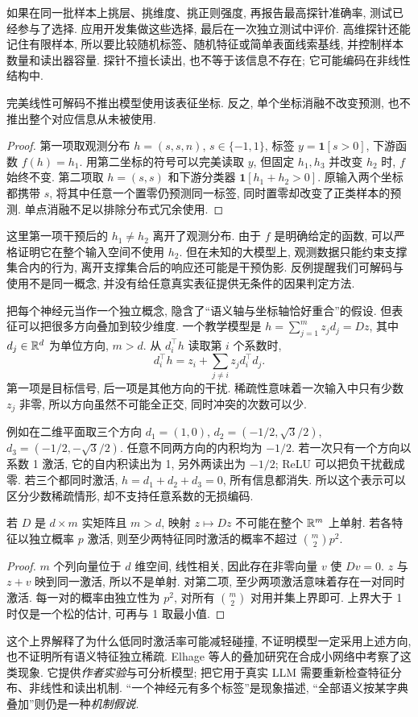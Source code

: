 如果在同一批样本上挑层、挑维度、挑正则强度, 再报告最高探针准确率, 测试已经参与了选择. 应用开发集做这些选择, 最后在一次独立测试中评价. 高维探针还能记住有限样本, 所以要比较随机标签、随机特征或简单表面线索基线, 并控制样本数量和读出器容量. 探针不擅长读出, 也不等于该信息不存在; 它可能编码在非线性结构中.

\begin{proposition}
完美线性可解码不推出模型使用该表征坐标. 反之, 单个坐标消融不改变预测, 也不推出整个对应信息从未被使用.
\end{proposition}
\begin{proof}
第一项取观测分布 $h=(s,s,n)$, $s\in\{-1,1\}$, 标签 $y=\mathbf1[s>0]$, 下游函数 $f(h)=h_1$. 用第二坐标的符号可以完美读取 $y$, 但固定 $h_1,h_3$ 并改变 $h_2$ 时, $f$ 始终不变. 第二项取 $h=(s,s)$ 和下游分类器 $\mathbf1[h_1+h_2>0]$. 原输入两个坐标都携带 $s$, 将其中任意一个置零仍预测同一标签, 同时置零却改变了正类样本的预测. 单点消融不足以排除分布式冗余使用.
\end{proof}
这里第一项干预后的 $h_1\ne h_2$ 离开了观测分布. 由于 $f$ 是明确给定的函数, 可以严格证明它在整个输入空间不使用 $h_2$. 但在未知的大模型上, 观测数据只能约束支撑集合内的行为, 离开支撑集合后的响应还可能是干预伪影. 反例提醒我们可解码与使用不是同一概念, 并没有给任意真实表征提供无条件的因果判定方法.

把每个神经元当作一个独立概念, 隐含了“语义轴与坐标轴恰好重合”的假设. 但表征可以把很多方向叠加到较少维度. 一个教学模型是 $h=\sum_{j=1}^m z_jd_j=Dz$, 其中 $d_j\in\mathbb R^d$ 为单位方向, $m>d$. 从 $d_i^\top h$ 读取第 $i$ 个系数时,
\[
d_i^\top h=z_i+\sum_{j\ne i}z_jd_i^\top d_j.
\]
第一项是目标信号, 后一项是其他方向的干扰. 稀疏性意味着一次输入中只有少数 $z_j$ 非零, 所以方向虽然不可能全正交, 同时冲突的次数可以少.

例如在二维平面取三个方向 $d_1=(1,0)$, $d_2=(-1/2,\sqrt3/2)$, $d_3=(-1/2,-\sqrt3/2)$. 任意不同两方向的内积均为 $-1/2$. 若一次只有一个方向以系数 1 激活, 它的自内积读出为 1, 另外两读出为 $-1/2$; ReLU 可以把负干扰截成零. 若三个都同时激活, $h=d_1+d_2+d_3=0$, 所有信息都消失. 所以这个表示可以区分少数稀疏情形, 却不支持任意系数的无损编码.

\begin{proposition}
若 $D$ 是 $d\times m$ 实矩阵且 $m>d$, 映射 $z\mapsto Dz$ 不可能在整个 $\mathbb R^m$ 上单射. 若各特征以独立概率 $p$ 激活, 则至少两特征同时激活的概率不超过 $\binom m2p^2$.
\end{proposition}
\begin{proof}
$m$ 个列向量位于 $d$ 维空间, 线性相关, 因此存在非零向量 $v$ 使 $Dv=0$. $z$ 与 $z+v$ 映到同一激活, 所以不是单射. 对第二项, 至少两项激活意味着存在一对同时激活. 每一对的概率由独立性为 $p^2$, 对所有 $\binom m2$ 对用并集上界即可. 上界大于 1 时仅是一个松的估计, 可再与 1 取最小值.
\end{proof}
这个上界解释了为什么低同时激活率可能减轻碰撞, 不证明模型一定采用上述方向, 也不证明所有语义特征独立稀疏. Elhage 等人的叠加研究在合成小网络中考察了这类现象\cite{superposition}. 它提供\emph{作者实验}与可分析模型; 把它用于真实 LLM 需要重新检查特征分布、非线性和读出机制. “一个神经元有多个标签”是现象描述, “全部语义按某字典叠加”则仍是一种\emph{机制假说}.

